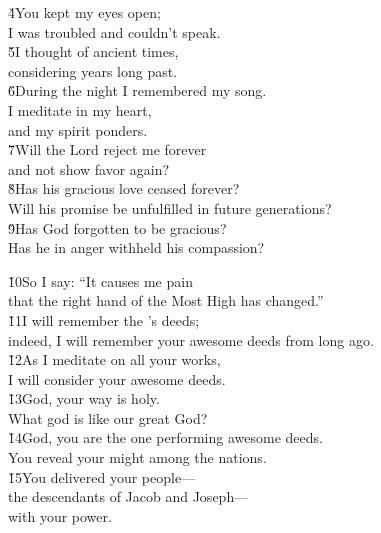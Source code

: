 \begin{poetry}
\poeml \v{4}You kept my eyes open; \\
\poemll    I was troubled and couldn't speak. \\
\poeml \v{5}I thought of ancient times, \\
\poemll    considering years long past. \\
\poeml \v{6}During the night I remembered my song. \\
\poemll    I meditate in my heart, \\
\poemlll       and my spirit ponders. \\
\poeml \v{7}Will the Lord reject me forever \\
\poemll    and not show favor again? \\
\poeml \v{8}Has his gracious love ceased forever? \\
\poemll    Will his promise be unfulfilled in future generations? \\
\poeml \v{9}Has God forgotten to be gracious? \\
\poemll    Has he in anger withheld his compassion?
\end{poetry}

\begin{poetry}
\poeml \v{10}So I say: ``It causes me pain \\
\poemll    that the right hand of the Most High has changed.'' \\
\poeml \v{11}I will remember the 's deeds; \\
\poemll    indeed, I will remember your awesome deeds from long ago. \\
\poeml \v{12}As I meditate on all your works, \\
\poemll    I will consider your awesome deeds. \\
\poeml \v{13}God, your way is holy. \\
\poemll    What god is like our great God? \\
\poeml \v{14}God, you are the one performing awesome deeds. \\
\poemll    You reveal your might among the nations. \\
\poeml \v{15}You delivered your people--- \\
\poemll    the descendants of Jacob and Joseph--- \\
\poemlll       with your power.
\end{poetry}

